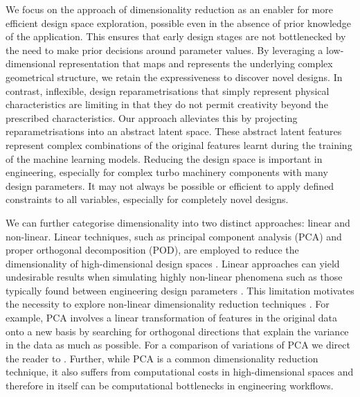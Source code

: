 \documentclass{article}
\begin{document}
We focus on the approach of dimensionality reduction as an enabler for more efficient design space exploration, possible even in the absence of prior knowledge of the application. This ensures that early design stages are not bottlenecked by the need to make prior decisions around parameter values. By leveraging a low-dimensional representation that maps and represents the underlying complex geometrical structure, we retain the expressiveness to discover novel designs. In contrast, inflexible, design reparametrisations that simply represent physical characteristics are limiting in that they do not permit creativity beyond the prescribed characteristics. Our approach alleviates this by projecting reparametrisations into an abstract latent space. These abstract latent features represent complex combinations of the original features learnt during the training of the machine learning models.  Reducing the design space is important in engineering, especially for complex turbo machinery components with many design parameters. It may not always be possible or efficient to apply defined constraints to all variables, especially for completely novel designs.

We can further categorise dimensionality into two distinct approaches: linear and non-linear. Linear techniques, such as principal component analysis (PCA) and proper orthogonal decomposition (POD), are employed to reduce the dimensionality of high-dimensional design spaces \citep{Diez2024}. Linear approaches can yield undesirable results when simulating highly non-linear phenomena such as those typically found between engineering design parameters \citep{Deshpande2024}. This limitation motivates the necessity to explore non-linear dimensionality reduction techniques \citep{Diez2024}. For example, PCA involves a linear transformation of features in the original data onto a new basis \citep{Donnelly2024} by searching for orthogonal directions that explain the variance in the data as much as possible. For a comparison of variations of PCA we direct the reader to \cite{Sorzano2014}. Further, while PCA is a common dimensionality reduction technique, it also suffers from computational costs in high-dimensional spaces \citep{Donnelly2024} and therefore in itself can be computational bottlenecks in engineering workflows.
\end{document}
